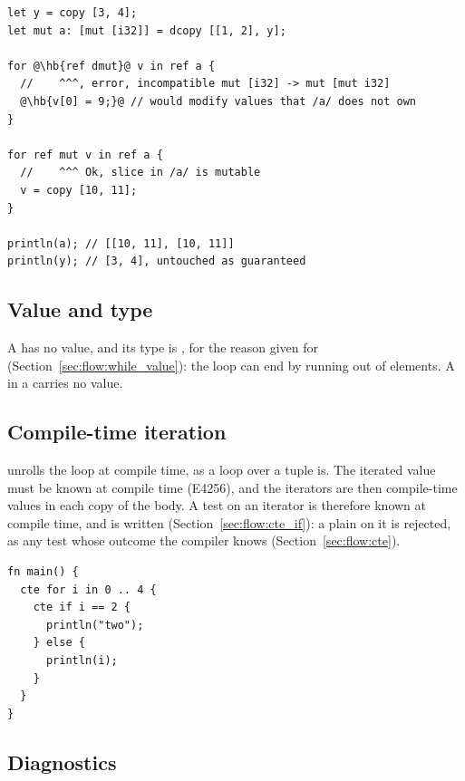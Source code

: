 \begin{lstlisting}[style=coloredverbatimError, escapechar=@]
let y = copy [3, 4];
let mut a: [mut [i32]] = dcopy [[1, 2], y];

for @\hb{ref dmut}@ v in ref a {
  //    ^^^, error, incompatible mut [i32] -> mut [mut i32]
  @\hb{v[0] = 9;}@ // would modify values that /a/ does not own
}

for ref mut v in ref a {
  //    ^^^ Ok, slice in /a/ is mutable
  v = copy [10, 11];
}

println(a); // [[10, 11], [10, 11]]
println(y); // [3, 4], untouched as guaranteed
\end{lstlisting}

\subsection{Value and type}

A  has no value, and its type is , for the reason given
for  (Section~\ref{sec:flow:while_value}): the loop can end by
running out of elements. A  in a  carries no value.

\subsection{Compile-time iteration}
\label{sec:flow:cte_for}

 unrolls the loop at compile time, as a loop over a tuple is. The
iterated value must be known at compile time (E4256), and the iterators are then
compile-time values in each copy of the body. A test on an iterator is
therefore known at compile time, and is written 
(Section~\ref{sec:flow:cte_if}): a plain  on it is rejected, as any
test whose outcome the compiler knows (Section~\ref{sec:flow:cte}).

\begin{lstlisting}[style=coloredverbatim, caption=A compile-time loop]
fn main() {
  cte for i in 0 .. 4 {
    cte if i == 2 {
      println("two");
    } else {
      println(i);
    }
  }
}
\end{lstlisting}

\subsection{Diagnostics}

